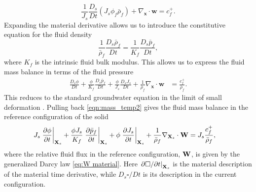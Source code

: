 \documentclass[11pt]{article}
\begin{document}
%
\begin{equation*}
  \frac{1}{J_s}\frac{D_s}{Dt} (J_s \phi_f \bar{\rho}_f) + \nabla_{\mathbf{x}} \cdot \mathbf{w} = c^{+}_f.
\end{equation*}
%
Expanding the material derivative allows us to introduce the constitutive equation for the fluid density
\begin{equation}
\frac{1}{\bar\rho_f} \frac{D_s \bar\rho_f}{D t} = \frac{1}{K_f}\frac{D_s \bar{p}_f}{D t},\label{eq:eos}
\end{equation}
where $K_f$ is the intrinsic fluid bulk modulus. This allows us to express the fluid mass balance in terms of the fluid pressure
\begin{align}
  \frac{D_s \phi}{Dt} + \frac{\phi}{K_f} \frac{D_s \bar{p}_f}{Dt} + \frac{\phi}{J_s} \frac{D_s J_s}{Dt}   + \frac{1}{\bar\rho_f} \nabla_{\mathbf{x}} \cdot \mathbf{w} &= \frac{c^{+}_f}{\bar\rho_f}.  \label{eqn:mass_temp2}
\end{align}
%
This reduces to the standard groundwater equation in the limit of small deformation \cite{bear1979}.  Pulling back \eqref{eqn:mass_temp2} gives the fluid mass balance in the reference configuration of the solid
%
\begin{align}
  J_s\left.\frac{\partial \phi}{\partial t}\right\vert_{\mathbf{X}_s} + \frac{\phi J_s}{K_f} \left.\frac{\partial \bar{p}_f}{\partial t}\right\vert_{\mathbf{X}_s} + \phi \left.\frac{\partial J_s}{\partial t}\right\vert_{\mathbf{X}_s} + \frac{1}{\bar\rho_f} \nabla_{\mathbf{X}_s} \cdot \mathbf{W} &= J_s \frac{c^{+}_f}{\bar\rho_f},  \label{eqn:fluid_mass_balance_pullback}
\end{align}
where the relative fluid flux in the reference configuration, $\mathbf{W}$, is given by the generalized Darcy law \eqref{eq:W material}. Here $\left.\partial \square/\partial t\right\vert_{\mathbf{X}_s}$ is the material description of the material time derivative, while $D_s \square/Dt$ is its description in the current configuration.
\end{document}
